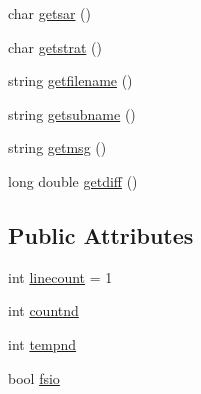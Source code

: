 \begin{DoxyCompactItemize}
\item 
char \mbox{\hyperlink{class_important_values_af4881f8a834e3a2e82c5923764044387}{getsar}} ()
\item 
char \mbox{\hyperlink{class_important_values_a56f8ed4ad80031911f3f73f92e7072d0}{getstrat}} ()
\item 
string \mbox{\hyperlink{class_important_values_a494a5739e9ba8dae2da674ce278bc54b}{getfilename}} ()
\item 
string \mbox{\hyperlink{class_important_values_a70dcb4a8e95fa8ab2a6a32b31e9ca2f1}{getsubname}} ()
\item 
string \mbox{\hyperlink{class_important_values_a17e7030f8a42eee1075ba1bd7bef1da0}{getmsg}} ()
\item 
long double \mbox{\hyperlink{class_important_values_abde2a056f4f52d6a5043e8c7c55eef15}{getdiff}} ()
\end{DoxyCompactItemize}
\subsection*{Public Attributes}
\begin{DoxyCompactItemize}
\item 
int \mbox{\hyperlink{class_important_values_aa1fccab8cdd381c30aa3b3d2eafe22de}{linecount}} = 1
\item 
int \mbox{\hyperlink{class_important_values_a52066b0a9f3206e776ac43c807bfee87}{countnd}}
\item 
int \mbox{\hyperlink{class_important_values_a1e954648acec1f3841e328a43d368ee1}{tempnd}}
\item 
bool \mbox{\hyperlink{class_important_values_ace1d4b6a3ddbecff16a1c5e19ac4c9da}{fsio}}
\end{DoxyCompactItemize}
